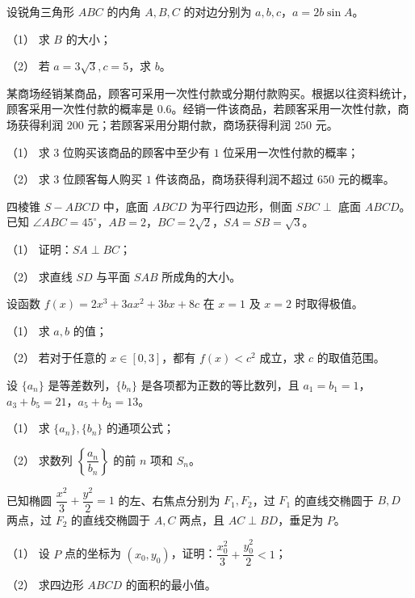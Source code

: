\begin{question}
设锐角三角形 $ABC$ 的内角 $A,B,C$ 的对边分别为 $a,b,c$，$a=2b\sin A$。

（1） 求 $B$ 的大小；

（2） 若 $a=3\sqrt3,c=5$，求 $b$。

\end{question}
\begin{question}
某商场经销某商品，顾客可采用一次性付款或分期付款购买。根据以往资料统计，顾客采用一次性付款的概率是 $0.6$。经销一件该商品，若顾客采用一次性付款，商场获得利润 $200$ 元；若顾客采用分期付款，商场获得利润 $250$ 元。

（1） 求 $3$ 位购买该商品的顾客中至少有 $1$ 位采用一次性付款的概率；

（2） 求 $3$ 位顾客每人购买 $1$ 件该商品，商场获得利润不超过 $650$ 元的概率。

\Needspace{0.4\textheight}
\end{question}
\begin{question}
四棱锥 $S-ABCD$ 中，底面 $ABCD$ 为平行四边形，侧面 $SBC\perp$ 底面 $ABCD$。已知 $\angle ABC=45^\circ$，$AB=2$，$BC=2\sqrt2$，$SA=SB=\sqrt3$。
\nopagebreak[4]
\begin{center}\end{center}
\nopagebreak[4]
（1） 证明：$SA\perp BC$；

（2） 求直线 $SD$ 与平面 $SAB$ 所成角的大小。

\end{question}
\begin{question}
设函数 $f(x)=2x^3+3ax^2+3bx+8c$ 在 $x=1$ 及 $x=2$ 时取得极值。

（1） 求 $a,b$ 的值；

（2） 若对于任意的 $x\in[0,3]$，都有 $f(x)<c^2$ 成立，求 $c$ 的取值范围。

\end{question}
\begin{question}
设 $\{a_n\}$ 是等差数列，$\{b_n\}$ 是各项都为正数的等比数列，且 $a_1=b_1=1$，$a_3+b_5=21$，$a_5+b_3=13$。

（1） 求 $\{a_n\},\{b_n\}$ 的通项公式；

（2） 求数列 $\left\{\dfrac{a_n}{b_n}\right\}$ 的前 $n$ 项和 $S_n$。

\end{question}
\begin{question}
已知椭圆 $\dfrac{x^2}{3}+\dfrac{y^2}{2}=1$ 的左、右焦点分别为 $F_1,F_2$，过 $F_1$ 的直线交椭圆于 $B,D$ 两点，过 $F_2$ 的直线交椭圆于 $A,C$ 两点，且 $AC\perp BD$，垂足为 $P$。

（1） 设 $P$ 点的坐标为 $(x_0,y_0)$，证明：$\dfrac{x_0^2}{3}+\dfrac{y_0^2}{2}<1$；

（2） 求四边形 $ABCD$ 的面积的最小值。

\end{question}